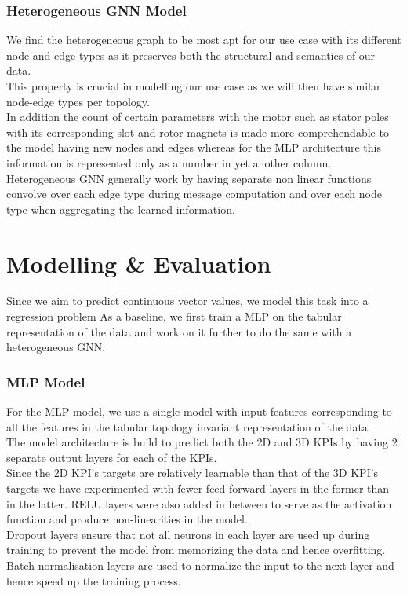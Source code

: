 \documentclass{report} %
\begin{document}
\subsection*{Heterogeneous \ac{GNN} Model}

We find the heterogeneous graph to be most apt for our use case with its different node and edge types as it preserves both the structural and semantics of our data. \\
This property is crucial in modelling our use case as we will then have similar node-edge types per topology. \\
In addition the count of certain parameters with the motor such as stator poles with its corresponding slot and rotor magnets is made more comprehendable to the model having new nodes and edges whereas for the \ac{MLP} architecture this information is represented only as a number in yet another column. \\
Heterogeneous \ac{GNN} generally work by having separate non linear functions convolve over each edge type during message computation and over each node type when aggregating the learned information. \\
 
\newpage 
\chapter*{Modelling \& Evaluation}

Since we aim to predict continuous vector values, we model this task into a regression problem
As a baseline, we first train a \ac{MLP} on the tabular representation of the data and work on it further to do the same with a heterogeneous \ac{GNN}.

\subsection*{\ac{MLP} Model}

For the \ac{MLP} model, we use a single model with input features corresponding to all the features in the tabular topology invariant representation of the data.\\
The model architecture is build to predict both the \ac{2D} and \ac{3D} \ac{KPI}s by having 2 separate output layers for each of the \ac{KPI}s. \\
Since the \ac{2D} \ac{KPI}'s targets are relatively learnable than that of the \ac{3D} \ac{KPI}'s targets we have experimented with fewer feed forward layers in the former than in the latter.
RELU layers were also added in between to serve as the activation function and produce non-linearities in the model. \\
Dropout layers ensure that not all neurons in each layer are used up during training to prevent the model from memorizing the data and hence overfitting.
Batch normalisation layers are used to normalize the input to the next layer and hence speed up the training process.\\
\end{document}
